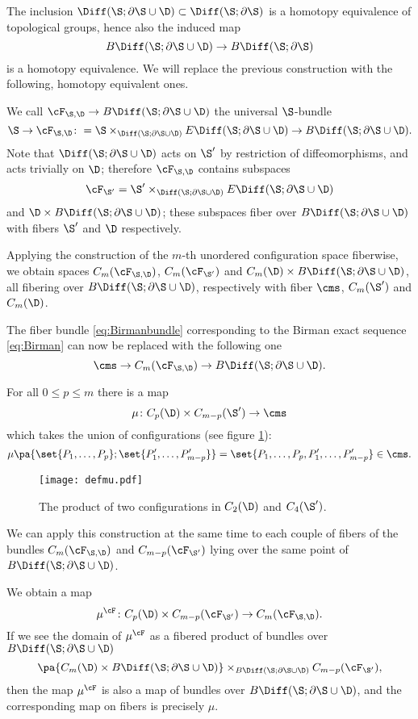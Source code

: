 The inclusion $\Diff(\S;\partial\S\cup\D)\subset\Diff(\S;\partial\S)$ is a homotopy
equivalence of topological groups, hence also the induced map
\[
B\Diff(\S;\partial\S\cup\D)\to B\Diff(\S;\partial\S)
\]
is a homotopy equivalence. We will replace the previous construction with the following,
homotopy equivalent ones.
\begin{defn}
\label{defn:universalSbundle}
We call $\cF_{\S,\D}\to B\Diff(\S;\partial\S\cup\D)$
the universal $\S$-bundle
 \[
  \S\to\cF_{\S,\D}\colon=\S\times_{\Diff(\S;\partial\S\cup\D)}E\Diff(\S;\partial\S\cup\D)\to B\Diff(\S;\partial\S\cup\D).
 \]
Note that $\Diff(\S;\partial\S\cup\D)$ acts on $\S'$ by restriction of diffeomorphisms, and acts trivially
on $\D$; therefore $\cF_{\S,\D}$ contains subspaces
\[
 \cF_{\S'}= \S'\times_{\Diff(\S;\partial\S\cup\D)}E\Diff(\S;\partial\S\cup\D)
\]
and $\D\times B\Diff(\S;\partial\S\cup\D)$; these subspaces fiber over $B\Diff(\S;\partial\S\cup\D)$
with fibers $\S'$ and $\D$ respectively.

Applying the construction of the $m$-th unordered configuration space fiberwise, we obtain spaces
$C_m(\cF_{\S,\D})$, $C_m(\cF_{\S'})$ and $C_m(\D)\times B\Diff(\S;\partial\S\cup\D)$,
all fibering over $B\Diff(\S;\partial\S\cup\D)$, respectively with fiber $\cms$,
$C_m(\S')$ and $C_m(\D)$.
\end{defn}
The fiber bundle \eqref{eq:Birmanbundle} corresponding to the Birman exact sequence \eqref{eq:Birman}
can now be replaced with the following one
\begin{equation}\label{eq:BirmanbundleD}
\cms\to C_m(\cF_{\S,\D})\to B\Diff(\S;\partial\S\cup\D).
\end{equation}

\begin{defn}
For all $0\leq p\leq m$ there is a map
\[
 \mu\colon C_p(\D)\times C_{m-p}(\S')\to \cms
\]
which takes the union of configurations (see figure \ref{fig:defmu}):
 \[
  \mu\pa{\set{P_1,\dots,P_p};\set{P'_1,\dots,P'_{m-p}}}=\set{P_1,\dots,P_p,P'_1,\dots,P'_{m-p}}\in\cms.
 \]
\begin{figure}\centering
 \texttt{[image: defmu.pdf]}
 \caption{The product of two configurations in $C_2(\D)$ and $C_4(\S')$.}
\label{fig:defmu}
\end{figure}
 
We can apply this construction at the same time to each couple of fibers of the bundles $C_m(\cF_{\S,\D})$ and $C_{m-p}(\cF_{\S'})$
lying over the same point of $ B\Diff(\S;\partial\S\cup\D)$.

We obtain a map
\[
 \mu^{\cF}\colon C_p(\D)\times C_{m-p}(\cF_{\S'})\to C_m(\cF_{\S,\D}).
\]
If we see the domain of $\mu^{\cF}$ as a fibered product of bundles over $B\Diff(\S;\partial\S\cup\D)$
\[
 \pa{C_m(\D)\times B\Diff(\S;\partial\S\cup\D)}\times_{B\Diff(\S;\partial\S\cup\D)}C_{m-p}(\cF_{\S'}),
\]
then the map $\mu^{\cF}$ is also a map of bundles over $B\Diff(\S;\partial\S\cup\D)$, and the corresponding
map on fibers is precisely $\mu$.
\end{defn}

